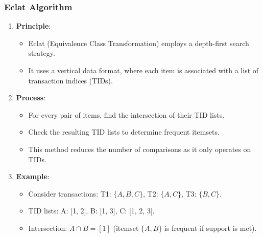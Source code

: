\documentclass{beamer}
\begin{document}
\begin{frame}[fragile]
    \frametitle{Eclat Algorithm}
    \begin{enumerate}
        \item \textbf{Principle}:
        \begin{itemize}
            \item Eclat (Equivalence Class Transformation) employs a depth-first search strategy.
            \item It uses a vertical data format, where each item is associated with a list of transaction indices (TIDs).
        \end{itemize}

        \item \textbf{Process}:
        \begin{itemize}
            \item For every pair of items, find the intersection of their TID lists.
            \item Check the resulting TID lists to determine frequent itemsets.
            \item This method reduces the number of comparisons as it only operates on TIDs.
        \end{itemize}

        \item \textbf{Example}:
        \begin{itemize}
            \item Consider transactions: T1: $\{A, B, C\}$, T2: $\{A, C\}$, T3: $\{B, C\}$.
            \item TID lists: A: [1, 2], B: [1, 3], C: [1, 2, 3].
            \item Intersection: $A \cap B = [1]$ (itemset $\{A, B\}$ is frequent if support is met).
        \end{itemize}
    \end{enumerate}
\end{frame}
\end{document}
